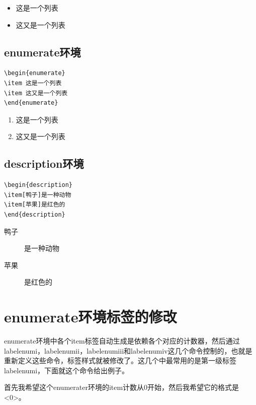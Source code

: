 \documentclass[11pt,oneside]{book}
\begin{document}
\begin{itemize}
\item 这是一个列表
\item 这又是一个列表
\end{itemize}



\subsection{enumerate环境}
\begin{Verbatim}
\begin{enumerate}
\item 这是一个列表
\item 这又是一个列表
\end{enumerate}
\end{Verbatim}

\begin{enumerate}
\item 这是一个列表
\item 这又是一个列表
\end{enumerate}

\subsection{description环境}
\begin{Verbatim}
\begin{description}
\item[鸭子]是一种动物
\item[苹果]是红色的
\end{description}
\end{Verbatim}
\begin{description}
\item[鸭子]是一种动物
\item[苹果]是红色的
\end{description}

\section{enumerate环境标签的修改}
\label{sec:enumerate环境标签的修改}
enumerate环境中各个item标签自动生成是依赖各个对应的计数器，然后通过labelenumi，labelenumii，labelenumiii和labelenumiv这几个命令控制的，也就是重新定义这些命令，标签样式就被修改了。这几个中最常用的是第一级标签labelenumi，下面就这个命令给出例子。

首先我希望这个enumerater环境的item计数从0开始，然后我希望它的格式是<0>。
\end{document}
